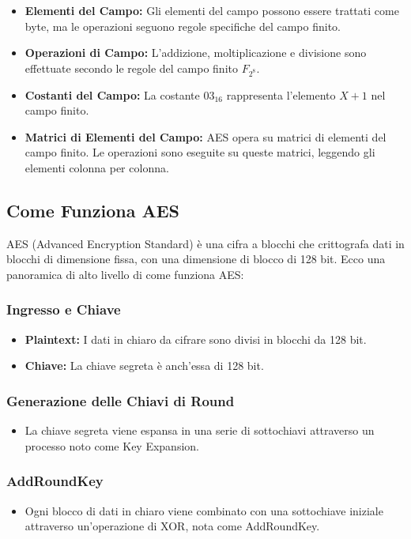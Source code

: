 \documentclass[11pt]{article}
\theoremstyle{definition} \newtheorem{definizione}{Definizione}[section] %
\begin{document}
    \begin{itemize}
      \item \textbf{Elementi del Campo:} Gli elementi del campo possono essere trattati come byte, ma le operazioni seguono regole specifiche del campo finito.
      \item \textbf{Operazioni di Campo:} L'addizione, moltiplicazione e divisione sono effettuate secondo le regole del campo finito $F_{2^8}$.
      \item \textbf{Costanti del Campo:} La costante $03_{16}$ rappresenta l'elemento $X + 1$ nel campo finito.
      \item \textbf{Matrici di Elementi del Campo:} AES opera su matrici di elementi del campo finito. Le operazioni sono eseguite su queste matrici, leggendo gli elementi colonna per colonna.
    \end{itemize}

    \subsection{Come Funziona AES}

        AES (Advanced Encryption Standard) è una cifra a blocchi che crittografa dati in blocchi di dimensione fissa, con una dimensione di blocco di 128 bit. Ecco una panoramica di alto livello di come funziona AES:

        \subsubsection*{Ingresso e Chiave}
        \begin{itemize}
        \item \textbf{Plaintext:} I dati in chiaro da cifrare sono divisi in blocchi da 128 bit.
        \item \textbf{Chiave:} La chiave segreta è anch'essa di 128 bit.
        \end{itemize}

        \subsubsection*{Generazione delle Chiavi di Round}
        \begin{itemize}
        \item La chiave segreta viene espansa in una serie di sottochiavi attraverso un processo noto come Key Expansion.
        \end{itemize}

        \subsubsection*{AddRoundKey}
        \begin{itemize}
        \item Ogni blocco di dati in chiaro viene combinato con una sottochiave iniziale attraverso un'operazione di XOR, nota come AddRoundKey.
        \end{itemize}
\end{document}
